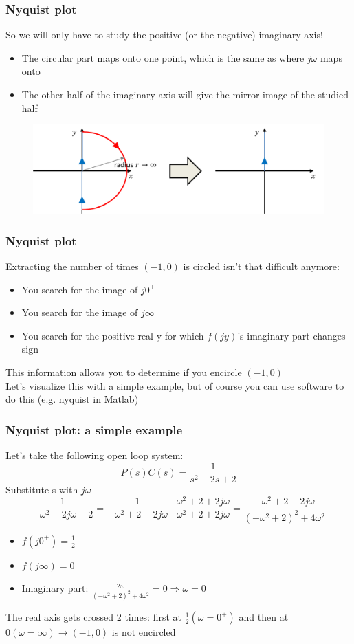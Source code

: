 \begin{frame}
	\frametitle{Nyquist plot}
	So we will only have to study the positive (or the negative) imaginary axis!\\
	\begin{itemize}
		\item The circular part maps onto one point, which is the same as where $j\omega$ maps onto
		\item The other half of the imaginary axis will give the mirror image of the studied half
	\end{itemize}	
	\begin{figure}
		\includegraphics[width=1\linewidth]{plot}
	\end{figure}
\end{frame}

\begin{frame}
	\frametitle{Nyquist plot}
	\vspace{-6ex}
	Extracting the number of times $(-1,0)$ is circled isn't that difficult anymore:
	\begin{itemize}
		\item You search for the image of $j0^+$
		\item You search for the image of $j\infty$
		\item You search for the positive real y for which $f(jy)$'s imaginary part changes sign
	\end{itemize}
	This information allows you to determine if you encircle $(-1,0)$\\
	Let's visualize this with a simple example, but of course you can use software to do this (e.g. nyquist in Matlab)
\end{frame}

\begin{frame}
	\frametitle{Nyquist plot: a simple example}
	Let's take the following open loop system: $$P(s)C(s)=\frac{1}{s^2-2s+2}$$
	Substitute s with $j\omega$  $$\frac{1}{-\omega^2-2j\omega+2}=\frac{1}{-\omega^2+2-2j\omega}\frac{-\omega^2+2+2j\omega}{-\omega^2+2+2j\omega}=\frac{-\omega^2+2+2j\omega}{(-\omega^2+2)^2+4\omega^2}$$
	\vspace{-2ex}
	\begin{itemize}
		\item $f(j0^+)=\frac{1}{2}$
		\item $f(j\infty)=0$
		\item Imaginary part: $\frac{2\omega}{(-\omega^2+2)^2+4\omega^2}=0\Rightarrow\omega=0$
	\end{itemize} 
	The real axis gets crossed 2 times: first at $\frac{1}{2} (\omega=0^+)$ and then at $0 (\omega=\infty) \rightarrow (-1,0)$ is not encircled
\end{frame}

